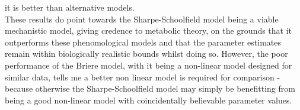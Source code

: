 \documentclass[fontsize=11pt]{scrartcl}\usepackage[]{graphicx}\usepackage[]{color}
\begin{document}
  it is better than alternative models. \\
  These results do point towards the Sharpe-Schoolfield model being a viable mechanistic model, giving credence
  to metabolic theory, on the grounds that it outperforms 
  these phenomological models and that the parameter estimates remain within biologically realistic bounds whilst doing so. 
  However, the poor performance of the Briere model, with it being a non-linear 
  model designed for similar data, tells me a better non linear model is required for comparison - because otherwise 
  the Sharpe-Schoolfield model may simply be benefitting from being a good non-linear model with coincidentally believable 
  parameter values.

  
  
\end{document}
